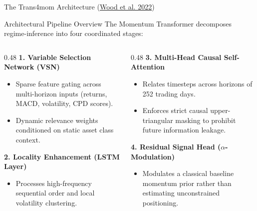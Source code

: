 \documentclass[10pt]{beamer}
\begin{document}
\begin{frame}{The Trans4mom Architecture (\href{https://arxiv.org/abs/2112.08534}{Wood et al. 2022})}
  \begin{block}{Architectural Pipeline Overview}
    The Momentum Transformer decomposes regime-inference into four coordinated stages:
  \end{block}
  \vspace{0.1cm}
  \begin{columns}[t]
    \begin{column}{0.48\textwidth}
      \textbf{1. Variable Selection Network (VSN)}
      \begin{itemize}\scriptsize
        \item Sparse feature gating across multi-horizon inputs (returns, MACD, volatility, CPD scores).
        \item Dynamic relevance weights conditioned on static asset class context.
      \end{itemize}
      \vspace{0.05cm}
      \textbf{2. Locality Enhancement (LSTM Layer)}
      \begin{itemize}\scriptsize
        \item Processes high-frequency sequential order and local volatility clustering.
      \end{itemize}
    \end{column}
    \begin{column}{0.48\textwidth}
      \textbf{3. Multi-Head Causal Self-Attention}
      \begin{itemize}\scriptsize
        \item Relates timesteps across horizons of 252 trading days.
        \item Enforces strict causal upper-triangular masking to prohibit future information leakage.
      \end{itemize}
      \vspace{0.05cm}
      \textbf{4. Residual Signal Head ($\alpha$-Modulation)}
      \begin{itemize}\scriptsize
        \item Modulates a classical baseline momentum prior rather than estimating unconstrained positioning.
      \end{itemize}
    \end{column}
  \end{columns}
\end{frame}
\end{document}

